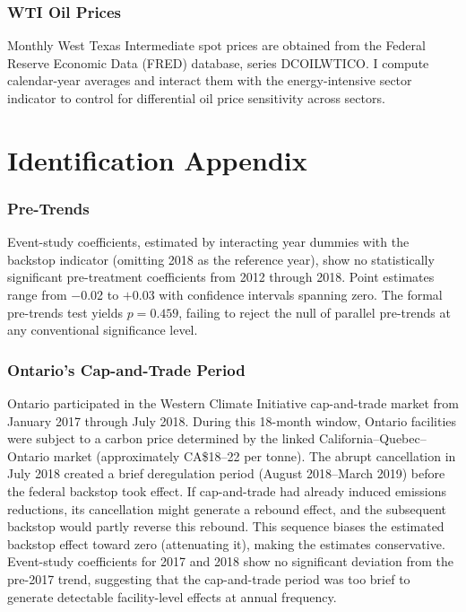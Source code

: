 \documentclass[12pt]{article}
\begin{document}
\subsubsection*{WTI Oil Prices} Monthly West Texas Intermediate spot prices are obtained from the Federal Reserve Economic Data (FRED) database, series DCOILWTICO. I compute calendar-year averages and interact them with the energy-intensive sector indicator to control for differential oil price sensitivity across sectors.


\section{Identification Appendix}
\label{app:id}

\subsubsection*{Pre-Trends} Event-study coefficients, estimated by interacting year dummies with the backstop indicator (omitting 2018 as the reference year), show no statistically significant pre-treatment coefficients from 2012 through 2018. Point estimates range from $-$0.02 to $+$0.03 with confidence intervals spanning zero. The formal \citet{Callaway2021} pre-trends test yields $p = 0.459$, failing to reject the null of parallel pre-trends at any conventional significance level.

\subsubsection*{Ontario's Cap-and-Trade Period} Ontario participated in the Western Climate Initiative cap-and-trade market from January 2017 through July 2018. During this 18-month window, Ontario facilities were subject to a carbon price determined by the linked California--Quebec--Ontario market (approximately CA\$18--22 per tonne). The abrupt cancellation in July 2018 created a brief deregulation period (August 2018--March 2019) before the federal backstop took effect. If cap-and-trade had already induced emissions reductions, its cancellation might generate a rebound effect, and the subsequent backstop would partly reverse this rebound. This sequence biases the estimated backstop effect toward zero (attenuating it), making the estimates conservative. Event-study coefficients for 2017 and 2018 show no significant deviation from the pre-2017 trend, suggesting that the cap-and-trade period was too brief to generate detectable facility-level effects at annual frequency.
\end{document}

